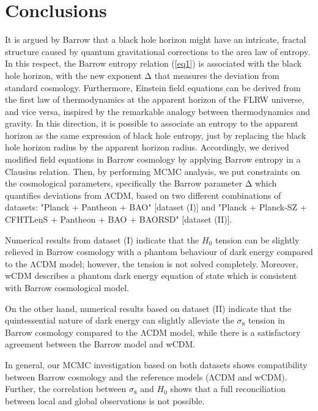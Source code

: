 \documentclass[11pt,twocolumn]{article}
\begin{document}
\section{Conclusions} \label{sec5}
It is argued by Barrow \cite{bw1} that a black hole horizon might
have an intricate, fractal structure caused by quantum
gravitational corrections to the area law of entropy. In this
respect, the Barrow entropy relation (\ref{eq1}) is associated with the
black hole horizon, with the new exponent $\mathrm{\Delta}$ that
measures the deviation from standard cosmology. Furthermore, Einstein
field equations can be derived from the first law of
thermodynamics at the apparent horizon of the FLRW universe, and vice
versa, inspired by the remarkable analogy between thermodynamics
and gravity. In this direction, it is possible to associate an
entropy to the apparent horizon as the same expression of black
hole entropy, just by replacing the black hole horizon radius by
the apparent horizon radius. Accordingly, we derived modified field
equations in Barrow cosmology by applying Barrow entropy in a
Clausius relation. Then, by performing MCMC analysis, we put
constraints on the cosmological parameters, specifically the
Barrow parameter $\mathrm{\Delta}$ which quantifies deviations
from $\mathrm{\Lambda}$CDM, based on two different combinations of
datasets: "Planck + Pantheon + BAO" [dataset (I)] and "Planck +
Planck-SZ + CFHTLenS + Pantheon + BAO + BAORSD" [dataset (II)].

Numerical results from dataset (I) indicate that the $H_0$ tension
can be slightly relieved in Barrow cosmology with a phantom
behaviour of dark energy compared to the $\mathrm{\Lambda}$CDM model; 
however, the tension is not solved completely. Moreover, wCDM describes a 
phantom dark energy equation of state which is consistent with Barrow cosmological model.
  
On the other hand, numerical results based on dataset (II) 
indicate that the quintessential nature of dark energy 
can slightly alleviate the $\sigma_8$ tension in Barrow cosmology 
compared to the $\mathrm{\Lambda}$CDM model, 
while there is a satisfactory agreement between the Barrow model and wCDM. 

In general, our MCMC investigation based on both datasets shows compatibility between 
Barrow cosmology and the reference models ($\mathrm{\Lambda}$CDM and wCDM).
Further, the correlation between $\sigma_8$ and $H_0$ shows that a
full reconciliation between local and global observations is not
possible.
\end{document}
